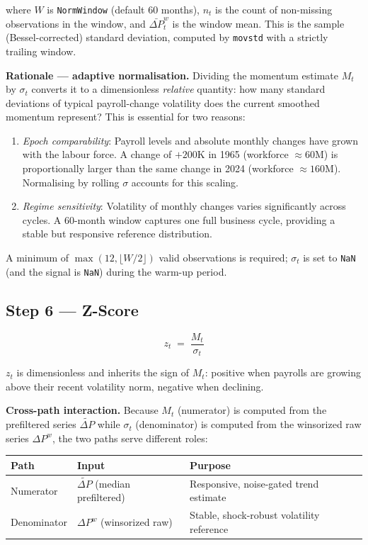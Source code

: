 \documentclass[11pt, a4paper]{article}
\newcommand{\dP}{\Delta P}
\begin{document}
where $W$ is \texttt{NormWindow} (default 60 months), $n_t$ is the
count of non-missing observations in the window, and
$\bar{\dP}^w_t$ is the window mean. This is the sample (Bessel-corrected)
standard deviation, computed by \texttt{movstd} with a strictly
trailing window.

\textbf{Rationale — adaptive normalisation.} Dividing the momentum
estimate $M_t$ by $\sigma_t$ converts it to a dimensionless
\emph{relative} quantity: how many standard deviations of typical
payroll-change volatility does the current smoothed momentum
represent? This is essential for two reasons:

\begin{enumerate}[leftmargin=2em]
  \item \emph{Epoch comparability}: Payroll levels and absolute
        monthly changes have grown with the labour force. A change
        of $+200$K in 1965 (workforce $\approx 60$M) is proportionally
        larger than the same change in 2024 (workforce $\approx 160$M).
        Normalising by rolling $\sigma$ accounts for this scaling.
  \item \emph{Regime sensitivity}: Volatility of monthly changes
        varies significantly across cycles. A 60-month window captures
        one full business cycle, providing a stable but responsive
        reference distribution.
\end{enumerate}

A minimum of $\max(12, \lfloor W/2 \rfloor)$ valid observations is
required; $\sigma_t$ is set to \texttt{NaN} (and the signal is
\texttt{NaN}) during the warm-up period.

\subsection{Step 6 — Z-Score}
\label{sec:step6}

\begin{equation}
  z_t \;=\; \frac{M_t}{\sigma_t}
\end{equation}

$z_t$ is dimensionless and inherits the sign of $M_t$: positive
when payrolls are growing above their recent volatility norm,
negative when declining.

\textbf{Cross-path interaction.} Because $M_t$ (numerator) is
computed from the prefiltered series $\tilde{\dP}$ while $\sigma_t$
(denominator) is computed from the winsorized raw series $\dP^w$,
the two paths serve different roles:

\begin{center}
\renewcommand{\arraystretch}{1.3}
\begin{tabular}{lll}
\toprule
\textbf{Path} & \textbf{Input} & \textbf{Purpose} \\
\midrule
Numerator   & $\tilde{\dP}$ (median prefiltered) & Responsive, noise-gated trend estimate \\
Denominator & $\dP^w$ (winsorized raw)           & Stable, shock-robust volatility reference \\
\bottomrule
\end{tabular}
\end{center}
\end{document}
